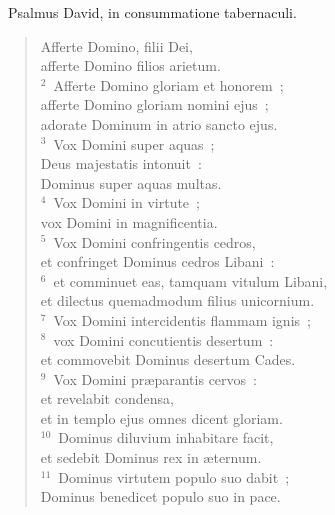 ~\lettrine[lines=10,image=true,loversize=0.05,lraise=-0.03]{P}{}salmus David, in consummatione tabernaculi. \begin{flushleft}\begin{verse}\vspace{6pt}Afferte Domino, filii Dei,\\ afferte Domino filios arietum.\\
${}^{2}$~Afferte Domino gloriam et honorem~;\\ afferte Domino gloriam nomini ejus~;\\ adorate Dominum in atrio sancto ejus.\\
${}^{3}$~Vox Domini super aquas~;\\ Deus majestatis intonuit~:\\ Dominus super aquas multas.\\
${}^{4}$~Vox Domini in virtute~;\\ vox Domini in magnificentia.\\
${}^{5}$~Vox Domini confringentis cedros,\\ et confringet Dominus cedros Libani~:\\
${}^{6}$~et comminuet eas, tamquam vitulum Libani,\\ et dilectus quemadmodum filius unicornium.\\
${}^{7}$~Vox Domini intercidentis flammam ignis~;\\
${}^{8}$~vox Domini concutientis desertum~:\\ et commovebit Dominus desertum Cades.\\
${}^{9}$~Vox Domini pr\ae parantis cervos~:\\ et revelabit condensa,\\ et in templo ejus omnes dicent gloriam.\\
${}^{10}$~Dominus diluvium inhabitare facit,\\ et sedebit Dominus rex in \ae ternum.\\
${}^{11}$~Dominus virtutem populo suo dabit~;\\ Dominus benedicet populo suo in pace.\end{verse}\end{flushleft}


